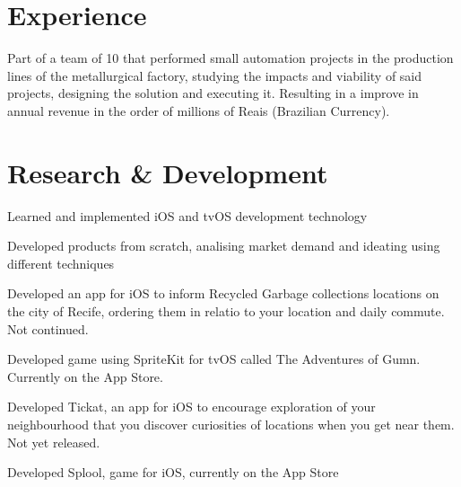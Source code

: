 \documentclass[]{deedy-resume-openfont}
\begin{document}
\hfill
\begin{minipage}[t]{0.64\textwidth} 


\section{Experience}

\vspace{\topsep} %
\begin{tightemize}
\item Part of a team of 10 that performed small automation projects in the production lines of the metallurgical factory, studying the impacts and viability of said projects, designing the solution and executing it. Resulting in a improve in annual revenue in the order of millions of Reais (Brazilian Currency).
\end{tightemize}
\sectionsep



\section{Research \& Development}
\begin{tightemize}
\item Learned and implemented iOS and tvOS development technology
\item Developed products from scratch, analising market demand and ideating using different techniques
\item Developed an app for iOS to inform Recycled Garbage collections locations on the city of Recife, ordering them in relatio to your location and daily commute. Not continued.
\item Developed game using SpriteKit for tvOS called The Adventures of Gumn. Currently on the App Store.
\item Developed Tickat, an app for iOS to encourage exploration of your neighbourhood that you discover curiosities of locations when you get near them. Not yet released.
\item Developed Splool, game for iOS, currently on the App Store
\end{tightemize}
\sectionsep


\end{minipage}
\end{document}
